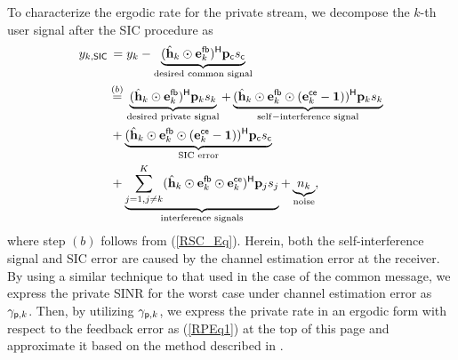 \documentclass[draftclsnofoot, onecolumn, comsoc, 12pt]{IEEEtran}
\begin{document}
{To characterize the ergodic rate for the private stream, we decompose the $k$-th user signal
after the SIC procedure as
\begin{align}
    \label{RSP_Eq} y_{k,\sf{SIC}} & \, = y_k - \underbrace{(\hat{\mathbf{h}}_{k} \odot {\mathbf{e}_{k}^{\sf{fb}}})^{\sf{H}} \mathbf{p}_{\sf{c}} s_{\sf{c}}}_{\rm{desired \,\, common \,\, signal}} \nonumber \\
    & \overset{(b)}{=} \underbrace{(\hat{\mathbf{h}}_{k} \odot {\mathbf{e}_{k}^{\sf{fb}}})^{\sf{H}} \mathbf{p}_{k} s_{k}}_{\rm{desired \,\, private \,\, signal}} + \underbrace{(\hat{\mathbf{h}}_{k} \odot {\mathbf{e}_{k}^{\sf{fb}}} \odot ({\mathbf{e}_{k}^{\sf{ce}}} - \mathbf{1}))^{\sf{H}} \mathbf{p}_{k} s_{k}}_{\rm{self-interference\,\,signal}} \nonumber \\
    & \, + \underbrace{(\hat{\mathbf{h}}_{k} \odot {\mathbf{e}_{k}^{\sf{fb}}} \odot ({\mathbf{e}_{k}^{\sf{ce}}} - \mathbf{1}))^{\sf{H}} \mathbf{p}_{\sf{c}} s_{\sf{c}}}_{\rm{SIC \,\, error}} \nonumber \\
    & \, + \underbrace{\sum_{j=1 , j \neq k}^{K} (\hat{\mathbf{h}}_{k} \odot {\mathbf{e}_{k}^{\sf{fb}}} \odot {\mathbf{e}_{k}^{\sf{ce}}})^{\sf{H}} \mathbf{p}_{j} s_{j}}_{\rm{interference \,\, signals}} + \underbrace{n_{k}}_{\rm{noise}},
\end{align}
where step $(b)$ follows from (\ref{RSC_Eq}).}
Herein, both the self-interference signal and SIC error are caused by the channel estimation error at the receiver.
By using a similar technique to that used in the case of the common message, we express the private SINR for the worst case under channel estimation error as $\gamma_{{\sf{p}},k}$.
Then, by utilizing $\gamma_{{\sf{p}},k}$, we express the private rate in an ergodic form with respect to the feedback error as (\ref{RPEq1}) at the top of this page and approximate it based on the method described in \cite{6816003}.
\end{document}
